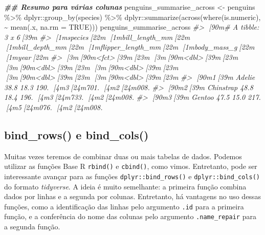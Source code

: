 \documentclass[
]{book}
\newenvironment{Shaded}{\begin{snugshade}}{\end{snugshade}}
\newcommand{\AttributeTok}[1]{\textcolor[rgb]{0.61,0.61,0.61}{#1}}
\newcommand{\CommentTok}[1]{\textcolor[rgb]{0.37,0.37,0.37}{\textit{#1}}}
\newcommand{\ConstantTok}[1]{\textcolor[rgb]{0,0,0}{#1}}
\newcommand{\DocumentationTok}[1]{\textcolor[rgb]{0.37,0.37,0.37}{\textbf{\textit{#1}}}}
\newcommand{\FunctionTok}[1]{\textcolor[rgb]{0,0,0}{#1}}
\newcommand{\NormalTok}[1]{#1}
\newcommand{\OtherTok}[1]{\textcolor[rgb]{0.37,0.37,0.37}{#1}}
\newcommand{\SpecialCharTok}[1]{\textcolor[rgb]{0,0,0}{#1}}
\begin{document}
\begin{Shaded}
\begin{Highlighting}[]
\DocumentationTok{\#\# Resumo para várias colunas}
\NormalTok{penguins\_summarise\_across }\OtherTok{\textless{}{-}}\NormalTok{ penguins }\SpecialCharTok{\%\textgreater{}\%} 
\NormalTok{  dplyr}\SpecialCharTok{::}\FunctionTok{group\_by}\NormalTok{(species) }\SpecialCharTok{\%\textgreater{}\%} 
\NormalTok{  dplyr}\SpecialCharTok{::}\FunctionTok{summarize}\NormalTok{(}\FunctionTok{across}\NormalTok{(}\FunctionTok{where}\NormalTok{(is.numeric), }\SpecialCharTok{\textasciitilde{}} \FunctionTok{mean}\NormalTok{(.x, }\AttributeTok{na.rm =} \ConstantTok{TRUE}\NormalTok{)))}
\NormalTok{penguins\_summarise\_across}
\CommentTok{\#\textgreater{} [90m\# A tibble: 3 x 6[39m}
\CommentTok{\#\textgreater{}   [1mspecies[22m   [1mbill\_length\_mm[22m [1mbill\_depth\_mm[22m [1mflipper\_length\_mm[22m [1mbody\_mass\_g[22m  [1myear[22m}
\CommentTok{\#\textgreater{}   [3m[90m\textless{}fct\textgreater{}[39m[23m              [3m[90m\textless{}dbl\textgreater{}[39m[23m         [3m[90m\textless{}dbl\textgreater{}[39m[23m             [3m[90m\textless{}dbl\textgreater{}[39m[23m       [3m[90m\textless{}dbl\textgreater{}[39m[23m [3m[90m\textless{}dbl\textgreater{}[39m[23m}
\CommentTok{\#\textgreater{} [90m1[39m Adelie              38.8          18.3              190.       [4m3[24m701. [4m2[24m008.}
\CommentTok{\#\textgreater{} [90m2[39m Chinstrap           48.8          18.4              196.       [4m3[24m733. [4m2[24m008.}
\CommentTok{\#\textgreater{} [90m3[39m Gentoo              47.5          15.0              217.       [4m5[24m076. [4m2[24m008.}
\end{Highlighting}
\end{Shaded}

\hypertarget{bind_rows-e-bind_cols}{%
\subsection{bind\_rows() e bind\_cols()}\label{bind_rows-e-bind_cols}}

Muitas vezes teremos de combinar duas ou mais tabelas de dados. Podemos utilizar as funções Base R \texttt{rbind()} e \texttt{cbind()}, como vimos. Entretanto, pode ser interessante avançar para as funções \texttt{dplyr::bind\_rows()} e \texttt{dplyr::bind\_cols()} do formato \emph{tidyverse}. A ideia é muito semelhante: a primeira função combina dados por linhas e a segunda por colunas. Entretanto, há vantagens no uso dessas funções, como a identificação das linhas pelo argumento \texttt{.id} para a primeira função, e a conferência do nome das colunas pelo argumento \texttt{.name\_repair} para a segunda função.
\end{document}
